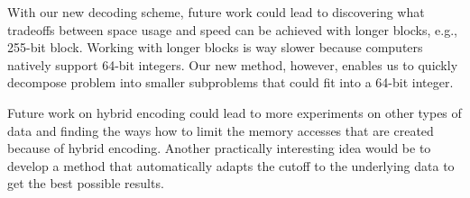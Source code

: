With our new decoding scheme, future work could lead to discovering what tradeoffs
between space usage and speed can be achieved with longer blocks, e.g., 255-bit block.
Working with longer blocks is way slower because computers natively support 64-bit
integers. Our new method, however, enables us to quickly decompose problem into smaller
subproblems that could fit into a 64-bit integer.

Future work on hybrid encoding could lead to more experiments on other types of data and finding
the ways how to limit the memory accesses that are created because of hybrid encoding. Another
practically interesting idea would be to develop a method that automatically adapts the cutoff
to the underlying data to get the best possible results.